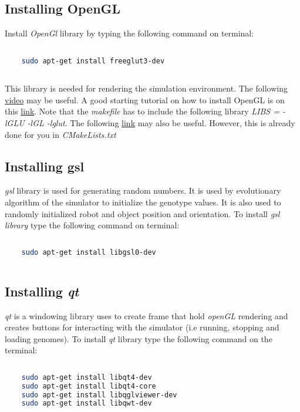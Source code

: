 \documentclass{article}
\begin{document}
\subsection{Installing OpenGL}
Install \emph{OpenGl} library by typing the following command on terminal:
\begin{lstlisting}[language=bash]

	sudo apt-get install freeglut3-dev
 
\end{lstlisting}
This library is needed for rendering the simulation environment. The following \href{http://www.youtube.com/watch?v=wEJr3IUPk-c}{video} may be useful. A good starting tutorial on how to install OpenGL is on this \href{http://www.videotutorialsrock.com/index.php}{link}. Note that the \emph{makefile} has to include the following library \emph{LIBS = -lGLU -lGL -lglut}. The following \href{http://ubuntuforums.org/showthread.php?t=1879827}{link} may also be useful. However, this is already done for you in \emph{CMakeLists.txt}
 
\subsection{Installing gsl}
 \emph{gsl} library is used for generating random numbers. It is used by evolutionary algorithm of the simulator to initialize the genotype values. It is also used to randomly initialized robot and object position and orientation. To install \emph{gsl library} type the following command on terminal:
  \begin{lstlisting}[language=bash]
  
  	sudo apt-get install libgsl0-dev
    
  \end{lstlisting}
  
\subsection{Installing \emph{qt}}
\emph{qt} is a windowing library uses to create frame that hold \emph{openGL} rendering and creates buttons for interacting with the simulator (i.e running, stopping and loading genomes). To install \emph{qt} library type the following command on the terminal:
  \begin{lstlisting}[language=bash]
  
  	sudo apt-get install libqt4-dev
  	sudo apt-get install libqt4-core
  	sudo apt-get install libqglviewer-dev
  	sudo apt-get install libqwt-dev
    
  \end{lstlisting}
\end{document}
